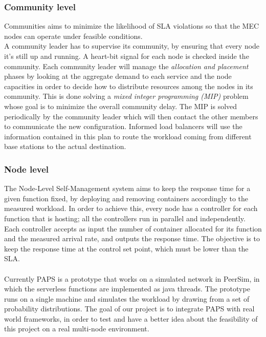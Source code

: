\begin{figure}[h]
    \centering
    \label{fig:pseudocode}
    \label{fig:communities}
\end{figure}

\subsubsection*{Community level}
Communities aims to minimize the likelihood of SLA violations so that the MEC nodes
can operate under feasible conditions.\\
A community leader has to supervise its community, by ensuring that every node it's still up and running.
A heart-bit signal for each node is checked inside the community.
Each community leader will manage the \textit{allocation and placement} phases by looking at 
the aggregate demand to each service and the node capacities in order to decide how to 
distribute resources among the nodes in its community. This is done solving a \textit{mixed
integer programming (MIP)} problem whose goal is to minimize the overall community delay. 
The MIP is solved periodically by the community leader which will then contact the other members
to communicate the new configuration.
Informed load balancers will use the information contained in this plan to route the workload 
coming from different base stations to the actual destination.

\subsubsection*{Node level}
The Node-Level Self-Management system aims to keep the response time for a given function fixed, 
by deploying and removing containers accordingly to the measured workload.
In order to achieve this, every node has a controller for each function that is hosting; all the controllers
run in parallel and independently.
Each controller accepts as input the number of container allocated for its function and the 
measured arrival rate, and outputs the response time. The objective is to keep the response time
at the control set point, which must be lower than the SLA.
\\
\\
Currently PAPS is a prototype that works on a simulated network in PeerSim,
in which the serverless functions are implemented as java threads. The prototype runs on a single machine and simulates
the workload by drawing from a set of probability distributions.
The goal of our project is to integrate PAPS with real world frameworks, in order to test and have a better
idea about the feasibility of this project on a real multi-node environment.
